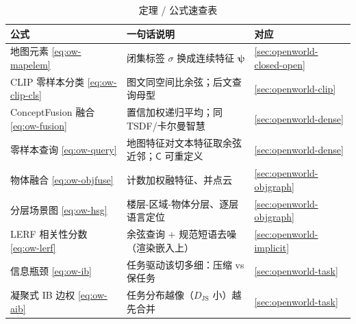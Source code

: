 \begin{table}[H]\centering\small
\caption{定理 / 公式速查表}
\begin{tabular}{lll}
\toprule
公式 & 一句话说明 & 对应 \\
\midrule
地图元素 \cref{eq:ow-mapelem} & 闭集标签 $\sigma$ 换成连续特征 $\boldsymbol\psi$ & \cref{sec:openworld-closed-open} \\
CLIP 零样本分类 \cref{eq:ow-clip-cls} & 图文同空间比余弦；后文查询母型 & \cref{sec:openworld-clip} \\
ConceptFusion 融合 \cref{eq:ow-fusion} & 置信加权递归平均；同 TSDF/卡尔曼智慧 & \cref{sec:openworld-dense} \\
零样本查询 \cref{eq:ow-query} & 地图特征对文本特征取余弦近邻；$\mathsf{C}$ 可重定义 & \cref{sec:openworld-dense} \\
物体融合 \cref{eq:ow-objfuse} & 计数加权融特征、并点云 & \cref{sec:openworld-objgraph} \\
分层场景图 \cref{eq:ow-hsg} & 楼层-区域-物体分层、逐层语言定位 & \cref{sec:openworld-objgraph} \\
LERF 相关性分数 \cref{eq:ow-lerf} & 余弦查询 $+$ 规范短语去噪（渲染嵌入上）& \cref{sec:openworld-implicit} \\
信息瓶颈 \cref{eq:ow-ib} & 任务驱动该切多细：压缩 vs 保任务 & \cref{sec:openworld-task} \\
凝聚式 IB 边权 \cref{eq:ow-aib} & 任务分布越像（$D_{\mathrm{JS}}$ 小）越先合并 & \cref{sec:openworld-task} \\
\bottomrule
\end{tabular}
\end{table}

